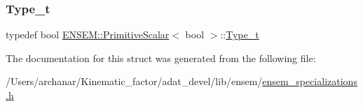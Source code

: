 \subsubsection{\texorpdfstring{Type\_t}{Type\_t}\hspace{0.1cm}{\footnotesize\ttfamily [2/2]}}
{\footnotesize\ttfamily typedef bool \mbox{\hyperlink{structENSEM_1_1PrimitiveScalar}{E\+N\+S\+E\+M\+::\+Primitive\+Scalar}}$<$ bool $>$\+::\mbox{\hyperlink{structENSEM_1_1PrimitiveScalar_3_01bool_01_4_a3433ef77cf65b05846eddc474f588a73}{Type\+\_\+t}}}



The documentation for this struct was generated from the following file\+:\begin{DoxyCompactItemize}
\item 
/\+Users/archanar/\+Kinematic\+\_\+factor/adat\+\_\+devel/lib/ensem/\mbox{\hyperlink{lib_2ensem_2ensem__specializations_8h}{ensem\+\_\+specializations.\+h}}\end{DoxyCompactItemize}
